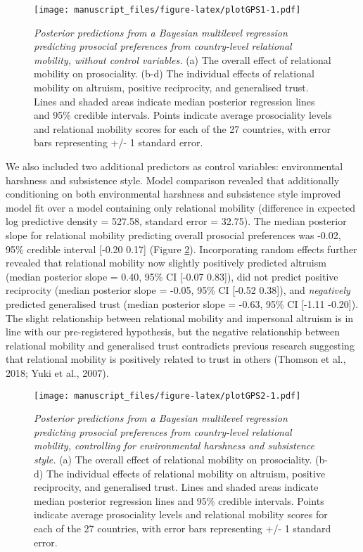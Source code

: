 \documentclass[english,man,floatsintext]{apa6}
\begin{document}
\begin{figure}
\centering
\texttt{[image: manuscript\_files/figure-latex/plotGPS1-1.pdf]}
\caption{\label{fig:plotGPS1}\emph{Posterior predictions from a Bayesian multilevel regression predicting prosocial preferences from country-level relational mobility, without control variables.} (a) The overall effect of relational mobility on prosociality. (b-d) The individual effects of relational mobility on altruism, positive reciprocity, and generalised trust. Lines and shaded areas indicate median posterior regression lines and 95\% credible intervals. Points indicate average prosociality levels and relational mobility scores for each of the 27 countries, with error bars representing +/- 1 standard error.}
\end{figure}

We also included two additional predictors as control variables: environmental harshness and subsistence style. Model comparison revealed that additionally conditioning on both environmental harshness and subsistence style improved model fit over a model containing only relational mobility (difference in expected log predictive density = 527.58, standard error = 32.75). The median posterior slope for relational mobility predicting overall prosocial preferences was -0.02, 95\% credible interval {[}-0.20 0.17{]} (Figure \ref{fig:plotGPS2}). Incorporating random effects further revealed that relational mobility now slightly positively predicted altruism (median posterior slope = 0.40, 95\% CI {[}-0.07 0.83{]}), did not predict positive reciprocity (median posterior slope = -0.05, 95\% CI {[}-0.52 0.38{]}), and \emph{negatively} predicted generalised trust (median posterior slope = -0.63, 95\% CI {[}-1.11 -0.20{]}). The slight relationship between relational mobility and impersonal altruism is in line with our pre-registered hypothesis, but the negative relationship between relational mobility and generalised trust contradicts previous research suggesting that relational mobility is positively related to trust in others (Thomson et al., 2018; Yuki et al., 2007).



\begin{figure}
\centering
\texttt{[image: manuscript\_files/figure-latex/plotGPS2-1.pdf]}
\caption{\label{fig:plotGPS2}\emph{Posterior predictions from a Bayesian multilevel regression predicting prosocial preferences from country-level relational mobility, controlling for environmental harshness and subsistence style.} (a) The overall effect of relational mobility on prosociality. (b-d) The individual effects of relational mobility on altruism, positive reciprocity, and generalised trust. Lines and shaded areas indicate median posterior regression lines and 95\% credible intervals. Points indicate average prosociality levels and relational mobility scores for each of the 27 countries, with error bars representing +/- 1 standard error.}
\end{figure}
\end{document}
